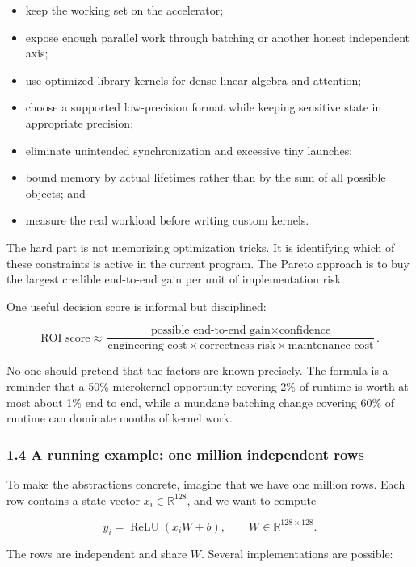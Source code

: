 \documentclass[
  10pt,
  letterpaper,
]{article}
\providecommand{\tightlist}{%
  \setlength{\itemsep}{0pt}\setlength{\parskip}{0pt}}
\begin{document}
\begin{itemize}
\tightlist
\item
  keep the working set on the accelerator;
\item
  expose enough parallel work through batching or another honest
  independent axis;
\item
  use optimized library kernels for dense linear algebra and attention;
\item
  choose a supported low-precision format while keeping sensitive state
  in appropriate precision;
\item
  eliminate unintended synchronization and excessive tiny launches;
\item
  bound memory by actual lifetimes rather than by the sum of all
  possible objects; and
\item
  measure the real workload before writing custom kernels.
\end{itemize}

The hard part is not memorizing optimization tricks. It is identifying
which of these constraints is active in the current program. The Pareto
approach is to buy the largest credible end-to-end gain per unit of
implementation risk.

One useful decision score is informal but disciplined:

\[
\text{ROI score}
\approx
\frac{\text{possible end-to-end gain}\times\text{confidence}}
{\text{engineering cost}\times\text{correctness risk}\times\text{maintenance cost}}.
\]

No one should pretend that the factors are known precisely. The formula
is a reminder that a 50\% microkernel opportunity covering 2\% of
runtime is worth at most about 1\% end to end, while a mundane batching
change covering 60\% of runtime can dominate months of kernel work.

\subsubsection{1.4 A running example: one million independent
rows}\label{14-a-running-example-one-million-independent-rows}

To make the abstractions concrete, imagine that we have one million
rows. Each row contains a state vector \(x_i\in\mathbb{R}^{128}\), and
we want to compute

\[
y_i=\operatorname{ReLU}(x_iW+b),
\qquad W\in\mathbb{R}^{128\times128}.
\]

The rows are independent and share \(W\). Several implementations are
possible:
\end{document}
